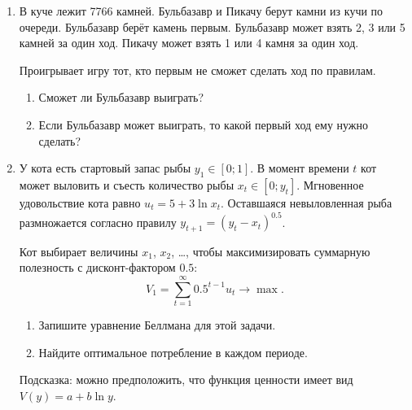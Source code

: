 \documentclass[12pt]{article}
\begin{document}
\begin{enumerate}
    \item 
        В куче лежит 7766 камней.
        Бульбазавр и Пикачу берут камни из кучи по очереди.
        Бульбазавр берёт камень первым.
        Бульбазавр может взять 2, 3 или 5 камней за один ход.
        Пикачу может взять 1 или 4 камня за один ход.
        
        Проигрывает игру тот, кто первым не сможет сделать ход по правилам.
        \begin{enumerate}
         \item Сможет ли Бульбазавр выиграть?
         \item Если Бульбазавр может выиграть, то какой первый ход ему нужно сделать?
        \end{enumerate}
    \item У кота есть стартовый запас рыбы $y_1 \in [0;1]$.
    В момент времени $t$ кот может выловить и съесть количество рыбы $x_t \in [0; y_t]$.
    Мгновенное удовольствие кота равно $u_t = 5 + 3\ln x_t$.
    Оставшаяся невыловленная рыба размножается согласно правилу $y_{t+1} = (y_t - x_t)^{0.5}$.

    Кот выбирает величины $x_1$, $x_2$, \ldots, чтобы максимизировать 
    суммарную полезность с дисконт-фактором $0.5$:
    \[
     V_1 = \sum_{t=1}^{\infty} 0.5^{t-1} u_t \to \max.
    \]

    \begin{enumerate}
        \item Запишите уравнение Беллмана для этой задачи. 
        \item Найдите оптимальное потребление в каждом периоде. 
    \end{enumerate}
    
 
 
    Подсказка: можно предположить, что функция ценности имеет вид $V(y) = a + b \ln y$.


\end{enumerate}
\end{document}
